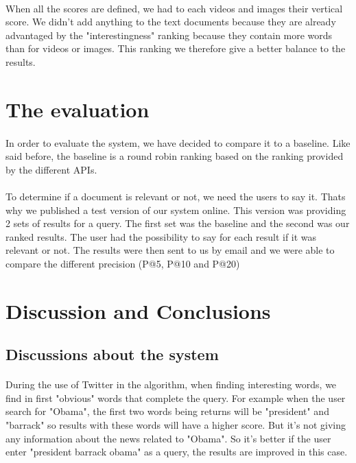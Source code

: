 \documentclass[10pt, a4paper]{article}
\begin{document}
\paragraph{}When all the scores are defined, we had to each videos and images their vertical score. We didn't add anything to the text documents because they are already advantaged by the "interestingness" ranking because they contain more words than for videos or images. This ranking we therefore give a better balance to the results.


\section{The evaluation}
\paragraph{}In order to evaluate the system, we have decided to compare it to a baseline. Like said before, the baseline is a round robin ranking based on the ranking provided by the different APIs.

\paragraph{}To determine if a document is relevant or not, we need the users to say it. Thats why we published a test version of our system online. This version was providing 2 sets of results for a query. The first set was the baseline and the second was our ranked results. The user had the possibility to say for each result if it was relevant or not. The results were then sent to us by email and we were able to compare the different precision (P@5, P@10 and P@20)

\section{Discussion and Conclusions}

\subsection{Discussions about the system}
\setcounter{secnumdepth}{4}
\paragraph{}During the use of Twitter in the algorithm, when finding interesting words, we find in first "obvious" words that complete the query. For example when the user search for "Obama", the first two words being returns will be "president" and "barrack" so results with these words will have a higher score. But it's not giving any information about the news related to "Obama". So it's better if the user enter "president barrack obama" as a query, the results are improved in this case.
\end{document}

